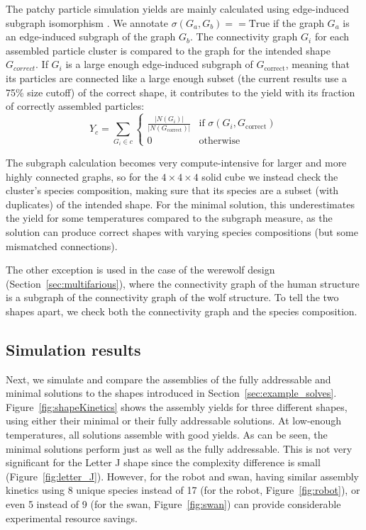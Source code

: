 The patchy particle simulation yields are mainly calculated using edge-induced subgraph isomorphism \cite{networkx}. 
We annotate \(\sigma(G_a,G_b) == \text{True}\) if the graph \(G_a\) is an edge-induced subgraph of the graph \(G_b\).
The connectivity graph \(G_i\) for each assembled particle cluster is compared to the graph for the intended shape \(G_{correct}\). If \(G_i\) is a large enough edge-induced subgraph of \(G_{\text{correct}}\), meaning that its particles are connected like a large enough subset (the current results use a 75\% size cutoff) of the correct shape, it contributes to the yield with its fraction of correctly assembled particles:
\begin{equation}
    Y_{c} = \sum_{G_i \in c} \begin{cases} 
           \frac{\left|N(G_i)\right|}{\left|N(G_{\text{correct}})\right|} & \text{if } \sigma(G_i,G_{\text{correct}}) \\
                          0 & \text{otherwise}
                        \end{cases}
\end{equation}

The subgraph calculation becomes very compute-intensive for larger and more highly connected graphs, so for the \(4 \times 4 \times 4\) solid cube we instead check the cluster's species composition, making sure that its species are a subset (with duplicates) of the intended shape. For the minimal solution, this underestimates the yield for some temperatures compared to the subgraph measure, as the solution can produce correct shapes with varying species compositions (but some mismatched connections). 

The other exception is used in the case of the werewolf design (Section~\ref{sec:multifarious}), where the connectivity graph of the human structure is a subgraph of the connectivity graph of the wolf structure. To tell the two shapes apart, we check both the connectivity graph and the species composition.


\subsection{Simulation results}

Next, we simulate and compare the assemblies of the fully addressable and minimal solutions to the shapes introduced in Section~\ref{sec:example_solves}. Figure~\ref{fig:shapeKinetics} shows the assembly yields for three different shapes, using either their minimal or their fully addressable solutions. At low-enough temperatures, all solutions assemble with good yields. As can be seen, the minimal solutions perform just as well as the fully addressable. This is not very significant for the Letter J shape since the complexity difference is small (Figure~\ref{fig:letter_J}). However, for the robot and swan, having similar assembly kinetics using 8 unique species instead of 17 (for the robot, Figure~\ref{fig:robot}), or even 5 instead of 9 (for the swan, Figure~\ref{fig:swan}) can provide considerable experimental resource savings.


